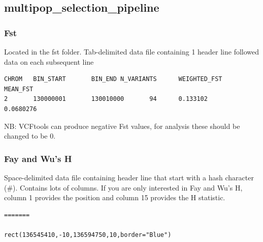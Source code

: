 \documentclass[a4paper,10pt]{article}
\begin{document}
\subsection{multipop\_selection\_pipeline}
\subsubsection{Fst}
Located in the fst folder. Tab-delimited data file containing 1 header line followed data on each subsequent line\\
\begin{verbatim}
CHROM   BIN_START       BIN_END N_VARIANTS      WEIGHTED_FST    MEAN_FST  
2       130000001       130010000       94      0.133102        0.0680276 
\end{verbatim}
NB: VCFtools can produce negative Fst values, for analysis these should be changed to be 0.
\subsubsection{Fay and Wu's H}
Space-delimited data file containing header line that start with a hash character (\#). Contains lots of columns. If you are only interested in Fay and Wu's H, column 1 provides the position and column 15 provides the H statistic. \\
\begin{verbatim}
=======
                             rect(136545410,-10,136594750,10,border="Blue")
                             \end{verbatim}
\end{document}
